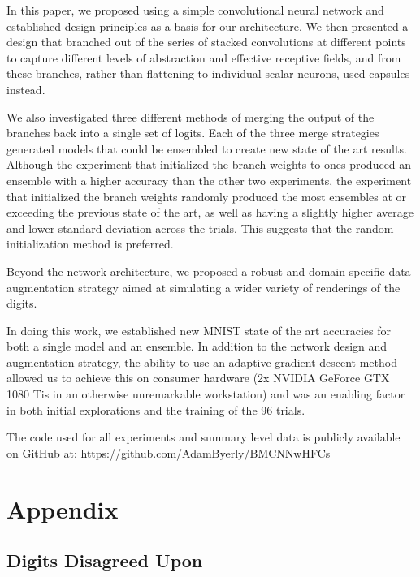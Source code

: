 \documentclass{article}
\begin{document}
In this paper, we proposed using a simple convolutional neural network and established design principles as a basis for our architecture.  We then presented a design that branched out of the series of stacked convolutions at different points to capture different levels of abstraction and effective receptive fields, and from these branches, rather than flattening to individual scalar neurons, used capsules instead.

We also investigated three different methods of merging the output of the branches back into a single set of logits.  Each of the three merge strategies generated models that could be ensembled to create new state of the art results.  Although the experiment that initialized the branch weights to ones produced an ensemble with a higher accuracy than the other two experiments, the experiment that initialized the branch weights randomly produced the most ensembles at or exceeding the previous state of the art, as well as having a slightly higher average and lower standard deviation across the trials.  This suggests that the random initialization method is preferred.

Beyond the network architecture, we proposed a robust and domain specific data augmentation strategy aimed at simulating a wider variety of renderings of the digits.

In doing this work, we established new MNIST state of the art accuracies for both a single model and an ensemble.  In addition to the network design and augmentation strategy, the ability to use an adaptive gradient descent method~\cite{Byerly2019} allowed us to achieve this on consumer hardware (2x NVIDIA GeForce GTX 1080 Tis in an otherwise unremarkable workstation) and was an enabling factor in both initial explorations and the training of the 96 trials.

\printbibliography{}

\bigskip

The code used for all experiments and summary level data is publicly available on GitHub at: \href{https://github.com/AdamByerly/BMCNNwHFCs}{https://github.com/AdamByerly/BMCNNwHFCs}

\bigskip

\appendix

\section{Appendix}\label{sec:appendix}

\subsection{Digits Disagreed Upon}
\end{document}
